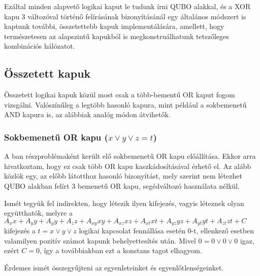 Ezáltal minden alapvető logikai kaput le tudunk írni QUBO alakkal, és a XOR kapu 3 változóval történő felírásának bizonyításánál egy általános módszert is kaptunk további, összetettebb kapuk implementálására, amellett, hogy természetesen az alapszintű kapukból is megkonstruálhatunk tetszőleges kombinációs hálózatot.

\subsection{Összetett kapuk}

Összetett logikai kapuk közül most csak a több-bementű OR kaput fogom vizsgálni. Valószínűleg a legtöbb hasonló kapura, mint például a sokbemenetű AND kapura is, az alábbiak analóg módon átvihetők.

\subsubsection{Sokbemenetű OR kapu ($x \vee y \vee z = t$)} \label{sec:MORgate}

A ban részproblémaként került elő sokbemenetű OR kapu előállítása. Ekkor arra hivatkoztam, hogy ez csak több OR kapu kaszkádosításával érhető el. Az alább közlök egy, az előbb látotthoz hasonló bizonyítást, mely szerint nem létezhet QUBO alakban felírt 3 bemenetű OR kapu, segédváltozó használata nélkül.

Ismét tegyük fel indirekten, hogy létezik ilyen kifejezés, vagyis léteznek olyan együtthatók, melyre a $A_{x}x+A_{y}y+A_{y}y+A_{z}z+ A_{xy}xy+A_{xz}xz+A_{xt}xt+ A_{yz}yz+A_{yt}yt+A_{zt}zt+C$ kifejezés a $t=x \vee y \vee z$ logikai kapcsolat fennállása esetén $0$-t, ellenkező esetben valamilyen pozitív számot kapunk behelyettesítés után.
Mivel $0=0 \vee 0 \vee 0$ igaz, ezért $C=0$, így a továbbiakban ezt a konstans tagot elhagyom.

Érdemes ismét összegyűjteni az egyenleteinket és egyenlőtlenségeinket.

